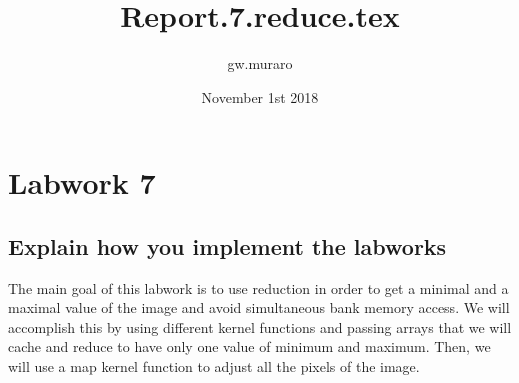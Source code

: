 \documentclass{article}
\title{Report.7.reduce.tex}
\author{gw.muraro}
\date{November 1st 2018}
\begin{document}
\maketitle
\section{Labwork 7}

\subsection{Explain how you implement the labworks}

    The main goal of this labwork is to use reduction in order to get a minimal and a maximal value of the image and avoid simultaneous bank memory access. We will accomplish this by using different kernel functions and passing arrays that we will cache and reduce to have only one value of minimum and maximum. Then, we will use a map kernel function to adjust all the pixels of the image. 
\end{document}
